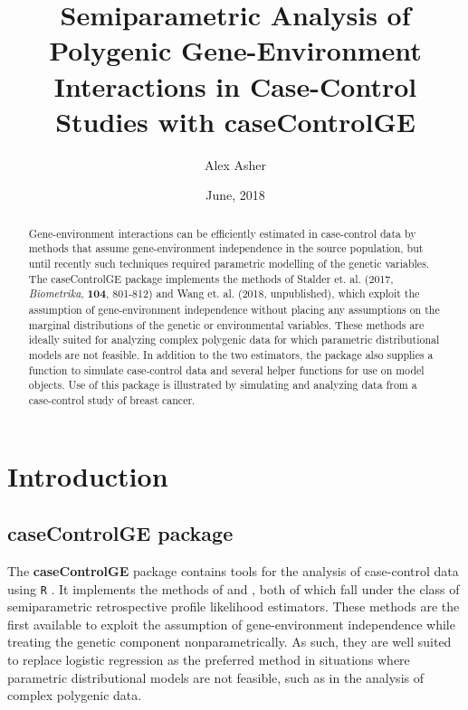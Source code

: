 \documentclass[11pt,]{article}
\title{Semiparametric Analysis of Polygenic Gene-Environment Interactions in
Case-Control Studies with caseControlGE}
\author{Alex Asher}
\date{June, 2018}
\begin{document}
\maketitle
\begin{abstract}
\noindent Gene-environment interactions can be efficiently estimated in
case-control data by methods that assume gene-environment independence
in the source population, but until recently such techniques required
parametric modelling of the genetic variables. The caseControlGE package
implements the methods of Stalder et. al. (2017, \emph{Biometrika},
\textbf{104}, 801-812) and Wang et. al. (2018, unpublished), which
exploit the assumption of gene-environment independence without placing
any assumptions on the marginal distributions of the genetic or
environmental variables. These methods are ideally suited for analyzing
complex polygenic data for which parametric distributional models are
not feasible. In addition to the two estimators, the package also
supplies a function to simulate case-control data and several helper
functions for use on model objects. Use of this package is illustrated
by simulating and analyzing data from a case-control study of breast
cancer.
\end{abstract}

{
\setcounter{tocdepth}{3}
\tableofcontents
}
\captionsetup{justification=centering, margin=0in}
\def\bbeta{\mbox{\boldmath $\beta$}} \def\pr{\hbox{pr}}
\def\E{{\mathbf E}}

\begin{titlepage}
\end{titlepage}

\onehalfspacing

\section{Introduction}

\subsection{caseControlGE package}

The \textbf{caseControlGE} package \citep{Asher2018R} contains tools for
the analysis of case-control data using \texttt{R} \citep{R2018}. It
implements the methods of \citet{Stalder2017} and
\citet{Wang2018unpublished}, both of which fall under the class of
semiparametric retrospective profile likelihood estimators. These
methods are the first available to exploit the assumption of
gene-environment independence while treating the genetic component
nonparametrically. As such, they are well suited to replace logistic
regression as the preferred method in situations where parametric
distributional models are not feasible, such as in the analysis of
complex polygenic data.
\end{document}

